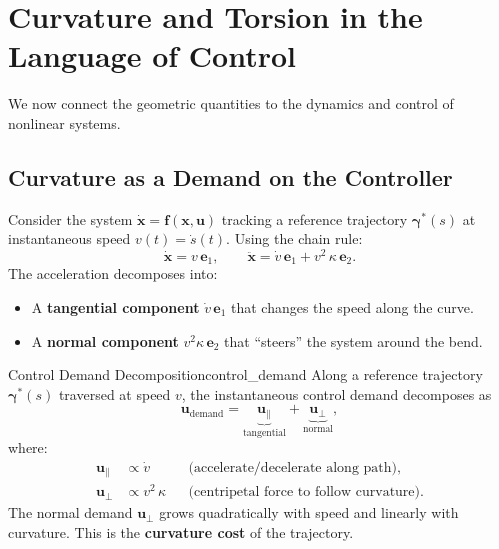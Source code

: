 \documentclass[12pt, openany]{book}
\theoremstyle{plain}
\newcommand{\state}{\bm{x}}
\newcommand{\control}{\bm{u}}
\newcommand{\traj}{\bm{\gamma}}
\newcommand{\tangent}{\bm{e}_1}
\newcommand{\normal}{\bm{e}_2}
\begin{document}
\section{Curvature and Torsion in the Language of Control}

We now connect the geometric quantities to the dynamics and control of
nonlinear systems.

\subsection{Curvature as a Demand on the Controller}

Consider the system $\dot{\state} = \bm{f}(\state, \control)$ tracking a
reference trajectory $\traj^*(s)$ at instantaneous speed $v(t) = \dot{s}(t)$.
Using the chain rule:
\begin{equation}
  \dot{\state} = v\, \tangent, \qquad
  \ddot{\state} = \dot{v}\, \tangent + v^2\, \kappa\, \normal.
\end{equation}
The acceleration decomposes into:
\begin{itemize}[leftmargin=1.5cm]
  \item A \textbf{tangential component} $\dot{v}\, \tangent$ that changes the
    speed along the curve.
  \item A \textbf{normal component} $v^2\kappa\, \normal$ that ``steers'' the
    system around the bend.
\end{itemize}

\begin{definition}{Control Demand Decomposition}{control_demand}
  Along a reference trajectory $\traj^*(s)$ traversed at speed $v$, the
  instantaneous control demand decomposes as
  \begin{equation}\label{eq:control_demand}
    \control_{\text{demand}} = \underbrace{\control_\parallel}_{\text{tangential}}
    + \underbrace{\control_\perp}_{\text{normal}},
  \end{equation}
  where:
  \begin{align}
    \control_\parallel &\propto \dot{v}
      && \text{(accelerate/decelerate along path)}, \\
    \control_\perp &\propto v^2\, \kappa
      && \text{(centripetal force to follow curvature)}.
  \end{align}
  The normal demand $\control_\perp$ grows quadratically with speed and linearly
  with curvature. This is the \textbf{curvature cost} of the trajectory.
\end{definition}
\end{document}
